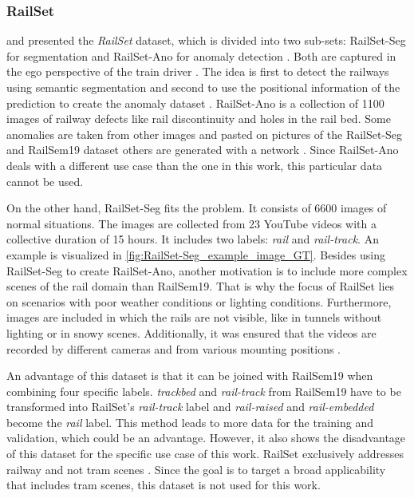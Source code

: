 \subsubsection{RailSet}
\label{subsubsec:RailSet}
\cite{railSet2022} and \cite{hadded2022application} presented the \textit{RailSet} dataset,
which is divided into two sub-sets: RailSet-Seg for segmentation and RailSet-Ano for anomaly detection \cite{railSet2022}.
Both are captured in the ego perspective of the train driver \cite{railSet2022} \cite{hadded2022application}.
The idea is first to detect the railways using semantic segmentation and second to use the positional information of the prediction to create the anomaly dataset \cite{railSet2022}.
RailSet-Ano is a collection of 1100 images of railway defects like rail discontinuity and holes in the rail bed.
Some anomalies are taken from other images and pasted on pictures of the RailSet-Seg and RailSem19 dataset others are generated with a network \cite{railSet2022}.
Since RailSet-Ano deals with a different use case than the one in this work, this particular data cannot be used.

On the other hand, RailSet-Seg fits the problem. It consists of 6600 images of normal situations.
The images are collected from 23 YouTube videos with a collective duration of 15 hours. It includes two labels: \textit{rail} and \textit{rail-track}. An example is visualized in \autoref{fig:RailSet-Seg_example_image_GT}.
Besides using RailSet-Seg to create RailSet-Ano, another motivation is to include more complex scenes of the rail domain than RailSem19.
That is why the focus of RailSet lies on scenarios with poor weather conditions or lighting conditions.
Furthermore, images are included in which the rails are not visible, like in tunnels without lighting or in snowy scenes.
Additionally, it was ensured that the videos are recorded by different cameras and from various mounting positions \cite{railSet2022} \cite{hadded2022application}. 

An advantage of this dataset is that it can be joined with RailSem19 when combining four specific labels.
\textit{trackbed} and \textit{rail-track} from RailSem19 have to be transformed into RailSet's \textit{rail-track} label and \textit{rail-raised} and \textit{rail-embedded} become the \textit{rail} label.
This method leads to more data for the training and validation, which could be an advantage.
However, it also shows the disadvantage of this dataset for the specific use case of this work.
RailSet exclusively addresses railway and not tram scenes \cite{hadded2022application}.
Since the goal is to target a broad applicability that includes tram scenes, this dataset is not used for this work.

